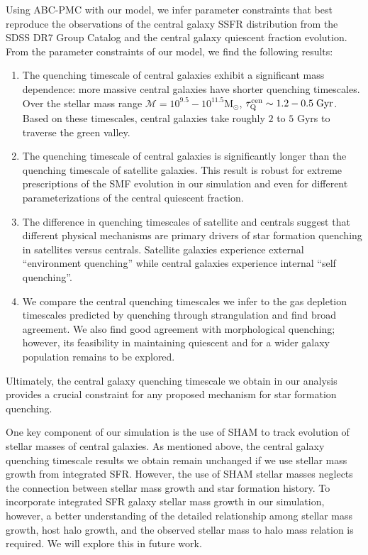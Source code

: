 Using ABC-PMC with our model, we infer parameter constraints that best 
reproduce the observations of the central galaxy SSFR distribution from the 
SDSS DR7 Group Catalog and the central galaxy quiescent fraction evolution.
From the parameter constraints of our model, we find the following 
results: 
\begin{enumerate}
\item The quenching timescale of central galaxies exhibit a significant mass 
dependence: more massive central galaxies have shorter quenching timescales. 
Over the stellar mass range $\mathcal{M} = 10^{9.5} - 10^{11.5}\mathrm{M}_\odot$, 
$\tau_\mathrm{Q}^\mathrm{cen} \sim 1.2 - 0.5 \;\mathrm{Gyr}$. Based on these timescales, 
central galaxies take roughly $2$ to $5$ Gyrs to traverse the green valley.  

\item The quenching timescale of central galaxies is significantly longer
than the quenching timescale of satellite galaxies. This result is robust for  
extreme prescriptions of the SMF evolution in our simulation and 
even for different parameterizations of the central quiescent fraction. 

\item The difference in quenching timescales of satellite and centrals
suggest that different physical mechanisms are primary drivers of 
star formation quenching in satellites versus centrals. Satellite galaxies  
experience external ``environment quenching'' while central galaxies  
experience internal ``self quenching''. 

\item We compare the central quenching timescales we infer to the 
gas depletion timescales predicted by quenching through strangulation 
and find broad agreement. We also find good agreement with 
morphological quenching; however, its feasibility in maintaining 
quiescent and for a wider galaxy population remains to be explored.

\end{enumerate}
\noindent Ultimately, the central galaxy quenching timescale we obtain in our analysis 
provides a crucial constraint for any proposed mechanism for star formation
quenching. 

One key component of our simulation is the use of SHAM to track evolution of
stellar masses of central galaxies. As mentioned above, the central galaxy 
quenching timescale results we obtain remain unchanged if we use stellar 
mass growth from integrated SFR. However, the use of SHAM stellar masses 
neglects the connection between stellar mass growth and star formation history. 
To incorporate integrated SFR galaxy stellar mass growth in our simulation, 
however, a better understanding of the detailed relationship among  
stellar mass growth, host halo growth, and the observed stellar mass to halo mass
relation is required. We will explore this in future work.  

